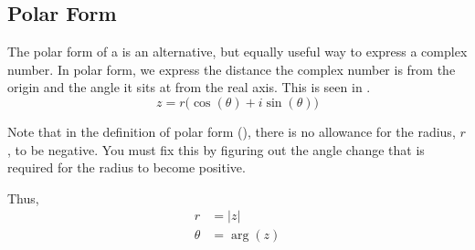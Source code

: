 \subsection{Polar Form}\label{subsec:Polar_Form}
The polar form of a  is an alternative, but equally useful way to express a complex number.
In polar form, we express the distance the complex number is from the origin and the angle it sits at from the real axis.
This is seen in .
\begin{equation}\label{eq:Polar_Form}
  z = r \bigl( \cos(\theta) + i \sin(\theta) \bigr)
\end{equation}

\begin{remark*}
  Note that in the definition of polar form (), there is no allowance for the radius, $r$, to be negative.
  You must fix this by figuring out the angle change that is required for the radius to become positive.
\end{remark*}

Thus,
\begin{align*}
  r &= \lvert z \rvert \\
  \theta &= \arg(z) \\
\end{align*}


